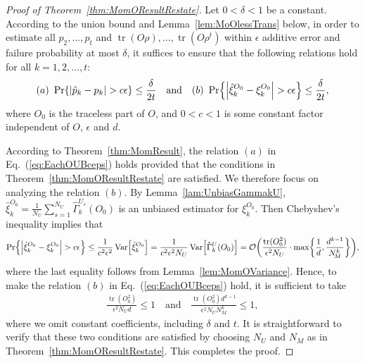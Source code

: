 \documentclass[aps,prl,twocolumn,nofootinbib,superscriptaddress,10pt]{revtex4-2}
\let\originalleft\left
\let\originalright\right
\renewcommand{\left}{\mathopen{}\mathclose\bgroup\originalleft}
\renewcommand{\right}{\aftergroup\egroup\originalright}
\DeclareMathOperator{\Var}{Var}
\DeclareMathOperator{\Tr}{tr}
\newcommand{\bigo}[1]{\mathcal{O}\left(#1\right)}
\theoremstyle{plain}
\theoremstyle{definition}
\newcommand{\eref}[1]{Eq.~\textup{(\ref{#1})}}
\newcommand{\lref}[1]{Lemma~\ref{#1}}
\newcommand{\tref}[1]{Theorem~\ref{#1}}
\begin{document}
\begin{proof}[Proof of \tref{thm:MomOResultRestate}]
Let $0<\delta<1$ be a constant. 
According to the union bound and \lref{lem:MoOlessTrans} below, in order to estimate all $p_2,\dots,p_t$ and
$\Tr(O\rho),\dots,\Tr(O\rho^t)$ within $\epsilon$ additive error and failure probability at most $\delta$, it 
suffices to ensure that the following relations hold for all $k=1,2,\dots,t$: 
\begin{align}\label{eq:EachOUBceps}
(a) \ 
\Pr\left\{ \left|\hat{p}_k-p_k\right| > c\epsilon \right\} \leq \frac{\delta}{2t}
\quad \text{and} \quad  
(b) \ 
\Pr\left\{ \left|\hat{\xi}_k^{O_0} - \xi_k^{O_0}\right| > c\epsilon \right\} \leq \frac{\delta}{2t}, 
\end{align}
where $O_0$ is the traceless part of $O$, and $0<c<1$ is some constant factor independent of $O$, $\epsilon$ and $d$.  

According to \tref{thm:MomResult}, the relation $(a)$ in \eref{eq:EachOUBceps}
holds provided that the conditions in \tref{thm:MomOResultRestate} are satisfied. 
We therefore focus on analyzing the relation $(b)$. 
By \lref{lam:UnbiasGammakU}, $\hat\xi_k^{O_0}= \frac{1}{N_U} \sum_{s=1}^{N_U} \hat{\Gamma}_k^{U_{\!s}}(O_0)$  is an unbiased estimator for $\xi_k^{O_0}$. 
Then Chebyshev's inequality implies that 
\begin{align}
\Pr\left\{ \left|\hat{\xi}_k^{O_0} - \xi_k^{O_0}\right| > c\epsilon \right\} 
\leq \frac{1}{c^2\epsilon^2} \Var\left[ \hat{\xi}_k^{O_0}\right] 
= \frac{1}{c^2\epsilon^2 N_U} \Var\!\Big[ \hat{\Gamma}_k^{U}(O_0)\Big] 
= \bigo{\frac{\Tr(O_0^2) }{\epsilon^2 N_U} \cdot \max\left\lbrace \frac{1}{d} ,\frac{d^{k-1}}{N_{\!M}^{k}}\right\rbrace},  
\end{align}
where the last equality follows from \lref{lem:MomOVariance}. 
Hence, to make the relation $(b)$ in \eref{eq:EachOUBceps} hold, it is sufficient to take 
\begin{align} 
\frac{\Tr(O_0^2)}{\epsilon^2 N_U d} \leq 1
\quad\text{and}\quad  
\frac{\Tr(O_0^2) d^{k-1}}{\epsilon^2 N_U N_{\!M}^{k}} \leq 1 , 
\end{align}
where we omit constant coefficients, including $\delta$ and $t$. 
It is straightforward to verify that these two conditions are satisfied by choosing $N_U$ and $N_M$ as in \tref{thm:MomOResultRestate}. 
This completes the proof. 
\end{proof}
\end{document}
